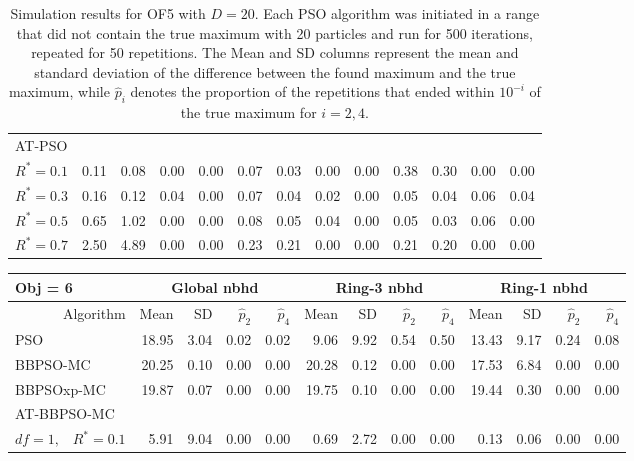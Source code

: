 \documentclass[12pt]{article}
\begin{document}
\begin{appendix}
\begin{table}[ht]
{\begin{tabular}{r|rrrr|rrrr|rrrr}
\hline
\multicolumn{1}{l|}{AT-PSO} &&&&&&&&&&&&\\
  $R^* = 0.1$ & 0.11 & 0.08 & 0.00 & 0.00 & 0.07 & 0.03 & 0.00 & 0.00 & 0.38 & 0.30 & 0.00 & 0.00 \\ 
  $R^* = 0.3$ & 0.16 & 0.12 & 0.04 & 0.00 & 0.07 & 0.04 & 0.02 & 0.00 & 0.05 & 0.04 & 0.06 & 0.04 \\ 
  $R^* = 0.5$ & 0.65 & 1.02 & 0.00 & 0.00 & 0.08 & 0.05 & 0.04 & 0.00 & 0.05 & 0.03 & 0.06 & 0.00 \\ 
  $R^* = 0.7$ & 2.50 & 4.89 & 0.00 & 0.00 & 0.23 & 0.21 & 0.00 & 0.00 & 0.21 & 0.20 & 0.00 & 0.00 \\ 
   \hline
\end{tabular}
}
\caption{Simulation results for OF5 with $D=20$. Each PSO algorithm was initiated in a range that did not contain the true maximum with 20 particles and run for 500 iterations, repeated for 50 repetitions. The Mean and SD columns represent the mean and standard deviation of the difference between the found maximum and the true maximum, while $\widehat{p}_i$ denotes the proportion of the repetitions that ended within $10^{-i}$ of the true maximum for $i=2,4$.}
\label{tab:psosim5}
\end{table}
\begin{table}[ht]
\centering
\footnotesize{
\begin{tabular}{r|rrrr|rrrr|rrrr}
\multicolumn{1}{l}{Obj = 6} & \multicolumn{4}{c}{Global nbhd} & \multicolumn{4}{c}{Ring-3 nbhd} & \multicolumn{4}{c}{Ring-1 nbhd}\\
  \hline
Algorithm & Mean & SD & $\widehat{p}_2$ & $\widehat{p}_4$ & Mean & SD & $\widehat{p}_2$ & $\widehat{p}_4$ & Mean & SD & $\widehat{p}_2$ & $\widehat{p}_4$ \\ 
  \hline
\multicolumn{1}{l|}{PSO} & 18.95 & 3.04 & 0.02 & 0.02 & 9.06 & 9.92 & 0.54 & 0.50 & 13.43 & 9.17 & 0.24 & 0.08 \\ 
  \multicolumn{1}{l|}{BBPSO-MC} & 20.25 & 0.10 & 0.00 & 0.00 & 20.28 & 0.12 & 0.00 & 0.00 & 17.53 & 6.84 & 0.00 & 0.00 \\ 
  \multicolumn{1}{l|}{BBPSOxp-MC} & 19.87 & 0.07 & 0.00 & 0.00 & 19.75 & 0.10 & 0.00 & 0.00 & 19.44 & 0.30 & 0.00 & 0.00 \\ 
\hline
\multicolumn{1}{l|}{AT-BBPSO-MC} &&&&&&&&&&&&\\
  $df = 1,\enspace$ $R^* =0.1$ & 5.91 & 9.04 & 0.00 & 0.00 & 0.69 & 2.72 & 0.00 & 0.00 & 0.13 & 0.06 & 0.00 & 0.00 \\ 

\end{tabular}}
\end{table}
\end{appendix}
\end{document}
